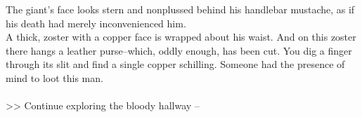 The giant's face looks stern and nonplussed behind his handlebar mustache, as if his death had merely inconvenienced him.\\

A thick, zoster with a copper face is wrapped about his waist. And on this zoster there hangs a leather purse--which, oddly enough, has been cut. You dig a finger through its slit and find a single copper schilling. Someone had the presence of mind to loot this man.\\
\\

>> Continue exploring the bloody hallway -- 